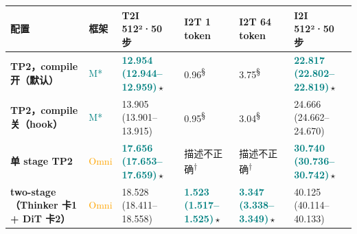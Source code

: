 \begin{tabularx}{\textwidth}{>{\bfseries}p{5.9cm} p{0.9cm} Y Y Y Y}
\toprule
{}
配置 & 框架 & T2I 512²·50 步 & I2T 1 token & I2T 64 token & I2I 512²·50 步 \\
\midrule
TP2，compile 开（默认） & \textcolor{Teal}{M*} & \textbf{\textcolor{Teal}{12.954\,\textcolor{Muted}{(12.944--12.959)}}}\,$\star$ & \textcolor{Muted}{0.96\textsuperscript{§}} & \textcolor{Muted}{3.75\textsuperscript{§}} & \textbf{\textcolor{Teal}{22.817\,\textcolor{Muted}{(22.802--22.819)}}}\,$\star$ \\
TP2，compile 关（hook） & \textcolor{Teal}{M*} & 13.905\,\textcolor{Muted}{(13.901--13.915)} & \textcolor{Muted}{0.95\textsuperscript{§}} & \textcolor{Muted}{3.04\textsuperscript{§}} & 24.666\,\textcolor{Muted}{(24.662--24.670)} \\
单 stage TP2 & \textcolor{Orange}{Omni} & \textbf{\textcolor{Teal}{17.656\,\textcolor{Muted}{(17.653--17.659)}}}\,$\star$ & \textcolor{Muted}{描述不正确\textsuperscript{†}} & \textcolor{Muted}{描述不正确\textsuperscript{†}} & \textbf{\textcolor{Teal}{30.740\,\textcolor{Muted}{(30.736--30.742)}}}\,$\star$ \\
two-stage（Thinker 卡1 + DiT 卡2） & \textcolor{Orange}{Omni} & 18.528\,\textcolor{Muted}{(18.411--18.558)} & \textbf{\textcolor{Teal}{1.523\,\textcolor{Muted}{(1.517--1.525)}}}\,$\star$ & \textbf{\textcolor{Teal}{3.347\,\textcolor{Muted}{(3.338--3.349)}}}\,$\star$ & 40.125\,\textcolor{Muted}{(40.114--40.133)} \\
\bottomrule
\end{tabularx}
